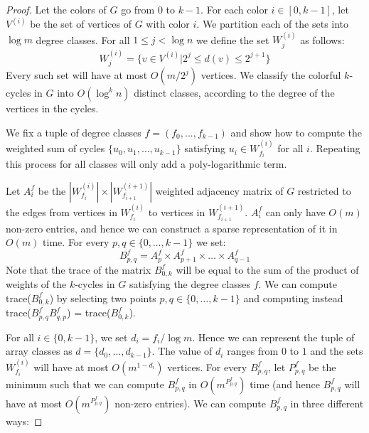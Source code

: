 \documentclass[a4paper,UKenglish,cleveref, autoref, numberwithinsect, thm-restate]{lipics-v2021}
\begin{document}
		\begin{proof}
			Let the colors of $G$ go from $0$ to $k-1$. For each color $i \in [0,k-1]$, let $V^{(i)}$ be the set of vertices of $G$ with color $i$. We partition each of the sets into $\log m$ degree classes. For all $1 \leq j < \log{n}$ we define the set $W^{(i)}_j$ as follows:
			\[
				W^{(i)}_j = \{v \in V^{(i)} | 2^j \leq d(v) \leq 2^{j+1}\}
			\]
			Every such set will have at most $O(m/2^j)$ vertices. We classify the colorful $k$-cycles in $G$ into $O(\log^k{n})$ distinct classes, according to the degree of the vertices in the cycles. 
			
			We fix a tuple of degree classes $f = (f_0,...,f_{k-1})$ and show how to compute the weighted sum of cycles $\{u_0,u_1,\dots,u_{k-1}\}$ satisfying $u_i \in W^{(i)}_{f_i}$ for all $i$. Repeating this process for all classes will only add a poly-logarithmic term.
			
			Let $A^f_{i}$ be the $|W^{(i)}_{f_i}| \times |W^{(i+1)}_{f_{i+1}}|$ weighted adjacency matrix of $G$ restricted to the edges from vertices in $W^{(i)}_{f_i}$ to vertices in $W^{(i+1)}_{f_{i+1}}$. $A^f_{i}$ can only have $O(m)$ non-zero entries, and hence we can construct a sparse representation of it in $O(m)$ time. For every $p,q \in \{0,\dots,k-1\}$ we set:
			\[
				B^f_{p,q} = A^f_p \times A^f_{p+1} \times \dots \times A^f_{q-1}
			\]
			Note that the trace of the matrix $B^f_{0,k}$ will be equal to the sum of the product of weights of the $k$-cycles in $G$ satisfying the degree classes $f$. We can compute trace($B^f_{0,k}$) by selecting two points $p,q \in \{0,\dots,k-1\}$ and computing instead trace($B^f_{p,q}B^f_{q,p}$) = trace($B^f_{0,k}$).
			
			For all $i \in \{0,k-1\}$, we set $d_i = f_i/\log{m}$. Hence we can represent the tuple of array classes as $d = \{d_0,...,d_{k-1}\}$. The value of $d_i$ ranges from $0$ to $1$ and the sets $W^{(i)}_{f_i}$ will have at most $O(m^{1-d_i})$ vertices. For every $B^f_{p,q}$, let $P^f_{p,q}$ be the minimum such that we can compute $B^f_{p,q}$ in $O(m^{P^f_{p,q}})$ time (and hence $B^f_{p,q}$ will have at most $O(m^{P^f_{p,q}})$ non-zero entries). We can compute $B^f_{p,q}$ in three different ways:
			

\end{proof}
\end{document}
